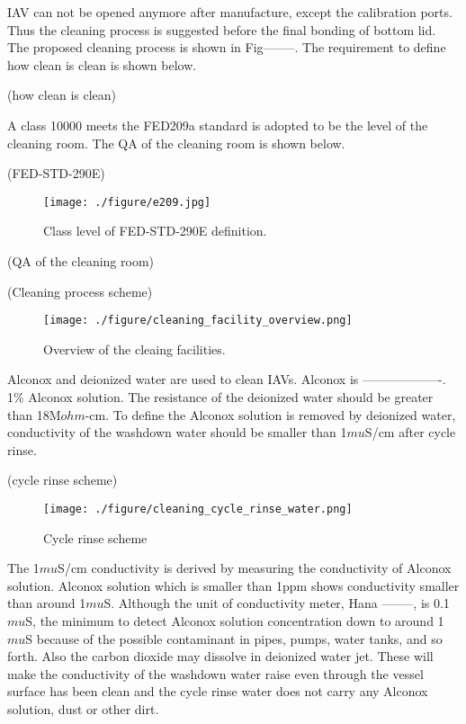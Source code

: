 IAV can not be opened anymore after manufacture, except the calibration ports.
Thus the cleaning process is suggested before the final bonding of bottom lid.
The proposed cleaning process is shown in Fig--------. The requirement to define
how clean is clean is shown below.


(how clean is clean)



A class 10000 meets the FED209a standard is adopted to be the level of the cleaning room.
The QA of the cleaning room is shown below.

(FED-STD-290E)

\begin{figure}
    \centering
    \texttt{[image: ./figure/e209.jpg]}
    \caption{Class level of FED-STD-290E definition.}
    \label{e209.jpg}
    \end{figure}





(QA of the cleaning room)




(Cleaning process scheme)
\begin{figure}
    \centering
    \texttt{[image: ./figure/cleaning\_facility\_overview.png]}
    \caption{Overview of the cleaing facilities.}
    \label{cleaning_facility_overview.png}
    \end{figure}

Alconox and deionized water are used to clean IAVs. Alconox is -------------------.
1\% Alconox solution.
The resistance of the deionized water should be greater than 18M$ohm$-cm.
To define the Alconox solution is removed by deionized water, conductivity of the
washdown water should be smaller than 1$mu$S/cm after cycle rinse.


(cycle rinse scheme)
\begin{figure}
    \centering
    \texttt{[image: ./figure/cleaning\_cycle\_rinse\_water.png]}
    \caption{Cycle rinse scheme}
    \label{cleaning_cycle_rinse_water.png}
    \end{figure}

The 1$mu$S/cm conductivity is derived by measuring the conductivity of Alconox solution.
Alconox solution which is smaller than 1ppm shows conductivity smaller than around 1$mu$S.
Although the unit of conductivity meter, Hana --------, is 0.1 $mu$S, the minimum to detect
Alconox solution concentration down to around 1$mu$S because of the possible contaminant
in pipes, pumps, water tanks, and so forth. Also the carbon dioxide may dissolve in
deionized water jet. These will make the conductivity of the washdown water raise
even through the vessel surface has been clean and the cycle rinse water does not
carry any Alconox solution, dust or other dirt.


